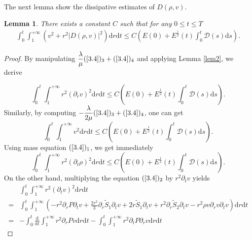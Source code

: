 \documentclass[10pt,reqno]{amsart}
\numberwithin{equation}{section}
\newtheorem{lemma}[theorem]{Lemma}
\begin{document}
	The next lemma show the dissipative estimates of $D(\rho, v)$.
	\begin{lemma}\label{lem3.4}
		There exists a constant $C$ such that for any $0\le t \le T$ 
		\begin{equation}
			\begin{aligned}
				\int_0^t\int_{1}^{+\infty}(v^2+r^2|D(\rho, v)|^2)\mathrm{d}r\mathrm{d}t
				\leq C\left(E(0)+E^{\frac{1}{2}}(t)\int_{0}^{t} \mathcal{D}(s)\mathrm{d}s\right).
			\end{aligned}
		\end{equation}
	\end{lemma}
	\begin{proof}
		By manipulating $\dfrac{\lambda}{\mu}(\ref{3.4})_{3}+(\ref{3.4})_{4}$
		and applying Lemma \ref{lem2}, we derive
		
		\begin{equation}\label{dis1}
			\int_0^t\int_{1}^{+\infty}r^2(\partial_{r}v)^2
			\mathrm{d}r\mathrm{d}t
			\leq C(E(0)+E^{\frac{1}{2}}(t)\int_{0}^{t} \mathcal{D}(s)\mathrm{d}s).
		\end{equation}
		Similarly, by computing $-\dfrac{\lambda}{2\mu}(\ref{3.4})_{3}+(\ref{3.4})_{4}$, one can get
		\begin{equation}
			\int_0^t\int_{1}^{+\infty}v^2
			\mathrm{d}r\mathrm{d}t
			\leq C(E(0)+E^{\frac{1}{2}}(t)\int_{0}^{t} \mathcal{D}(s)\mathrm{d}s).
		\end{equation}
		Using mass  equation $(\ref{3.4})_{1}$, we get immediately
		\begin{equation}\label{dis2}
			\int_0^t\int_{1}^{+\infty}r^2(\partial_{t}\rho)^2
			\mathrm{d}r\mathrm{d}t
			\leq C(E(0)+E^{\frac{1}{2}}(t)\int_{0}^{t} \mathcal{D}(s)\mathrm{d}s).
		\end{equation}
		On the other hand, multiplying the equation
		$(\ref{3.4})_{2}$ by $r^2\partial_{t}v$ yields
		\begin{equation}\nonumber
			\begin{aligned}
				&\int_0^t\int_{1}^{+\infty}r^2(\partial_{t}v)^2\mathrm{d}r\mathrm{d}t\\
				=&\int_0^t\int_{1}^{+\infty}(-r^2\partial_{r}P\partial_{t}v+\frac{2r^2}{3}\partial_r\tilde{S}_1\partial_{t}v+2r\tilde{S}_1\partial_{t}v
				+r^2\partial_r\tilde{S}_2\partial_{t}v
				-r^2\rho v \partial_{r}v\partial_{t}v)\mathrm{d}r\mathrm{d}t\\
				=&-\int_0^t\frac{\mathrm{d}}{\mathrm{d}t}\int_{1}^{+\infty}r^2\partial_{r}Pv\mathrm{d}r\mathrm{d}t
				-\int_0^t\int_{1}^{+\infty}r^2\partial_{t}P\partial_{r}v\mathrm{d}r\mathrm{d}t

\end{aligned}
\end{equation}
\end{proof}
\end{document}
